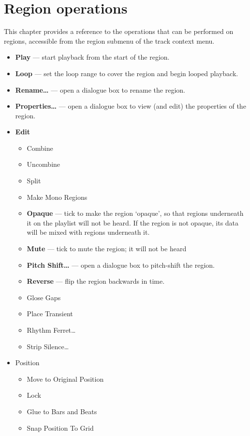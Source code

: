 \documentclass[10pt,a4paper]{book}
\begin{document}
{\chapter{Region operations}
\label{ch:region-operations}

This chapter provides a reference to the operations that can be
performed on regions, accessible from the region submenu of the track
context menu.

\begin{itemize}
\item \textbf{Play} --- start playback from the start of the region.
\item \textbf{Loop} --- set the loop range to cover the region and begin looped playback.
\item \textbf{Rename\ldots} --- open a dialogue box to rename the region.
\item \textbf{Properties\ldots} --- open a dialogue box to view (and edit) the properties of the region.
\item \textbf{Edit}
\begin{itemize}
\item Combine
\item Uncombine
\item Split
\item Make Mono Regions
\item \textbf{Opaque} --- tick to make the region `opaque', so that
  regions underneath it on the playlist will not be heard.  If the
  region is not opaque, its data will be mixed with regions underneath
  it.
\item \textbf{Mute} --- tick to mute the region; it will not be heard
\item \textbf{Pitch Shift\ldots} --- open a dialogue box to
  pitch-shift the region.
\item \textbf{Reverse} --- flip the region backwards in time.
\item Glose Gaps
\item Place Transient
\item Rhythm Ferret\ldots
\item Strip Silence\ldots
\end{itemize}
\item Position
\begin{itemize}
\item Move to Original Position
\item Lock
\item Glue to Bars and Beats
\item Snap Position To Grid

\end{itemize}
\end{itemize}}
\end{document}
